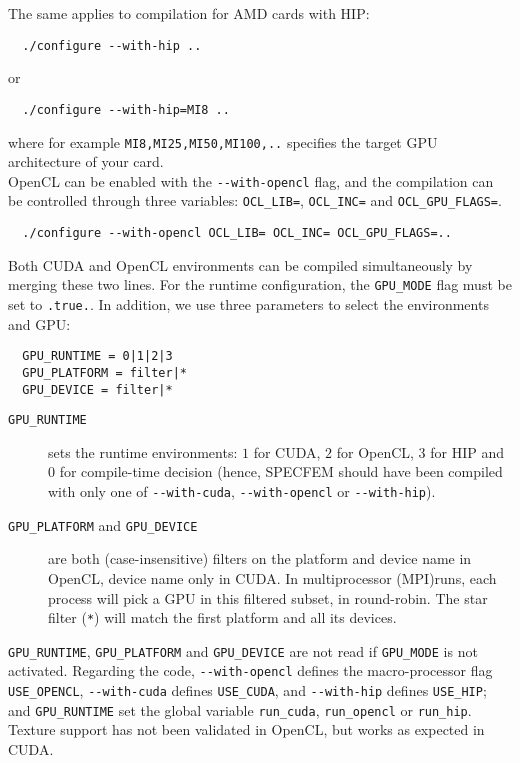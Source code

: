 The same applies to compilation for AMD cards with HIP:
{\small
\begin{verbatim}
  ./configure --with-hip ..
\end{verbatim}
}
or
{\small
\begin{verbatim}
  ./configure --with-hip=MI8 ..
\end{verbatim}
}
\noindent
where for example \texttt{MI8,MI25,MI50,MI100,..} specifies the target GPU architecture of your card.\\


OpenCL can be enabled with the \texttt{-{}-with-opencl} flag, and the
compilation can be controlled through three variables: \texttt{OCL\_LIB=},
\texttt{OCL\_INC=} and \texttt{OCL\_GPU\_FLAGS=}.
{\small
\begin{verbatim}
  ./configure --with-opencl OCL_LIB= OCL_INC= OCL_GPU_FLAGS=..
\end{verbatim}
}

Both CUDA and OpenCL environments can be compiled simultaneously by merging these two lines.
For the runtime configuration, the \texttt{GPU\_MODE} flag must be set
to \texttt{.true.}. In addition, we use three parameters to select the
environments and GPU:
{\small
\begin{verbatim}
  GPU_RUNTIME = 0|1|2|3
  GPU_PLATFORM = filter|*
  GPU_DEVICE = filter|*
\end{verbatim}
}

\begin{description}
\item[\texttt{GPU\_RUNTIME}] sets the runtime environments: $1$ for CUDA, $2$ for OpenCL, $3$ for HIP
 and $0$ for compile-time decision (hence, SPECFEM should
have been compiled with only one of \texttt{-{}-with-cuda}, \texttt{-{}-with-opencl} or \texttt{-{}-with-hip}).

\item[\texttt{GPU\_PLATFORM} and \texttt{GPU\_DEVICE}] are both (case-insensitive)
filters on the platform and device name in OpenCL, device name only in
CUDA. In multiprocessor (MPI)runs, each process will pick a GPU in
this filtered subset, in round-robin. The star filter (\texttt{*})
will match the first platform and all its devices.
\end{description}

\texttt{GPU\_RUNTIME}, \texttt{GPU\_PLATFORM} and \texttt{GPU\_DEVICE}
are not read if \texttt{GPU\_MODE} is not activated.
Regarding the code, \texttt{-{}-with-opencl} defines the
macro-processor flag \texttt{USE\_OPENCL}, \texttt{-{}-with-cuda}
defines \texttt{USE\_CUDA}, and \texttt{-{}-with-hip}
defines \texttt{USE\_HIP}; and \texttt{GPU\_RUNTIME} set the global
variable \texttt{run\_cuda}, \texttt{run\_opencl} or \texttt{run\_hip}.
Texture support has not been validated in OpenCL, but works as
expected in CUDA.\\


